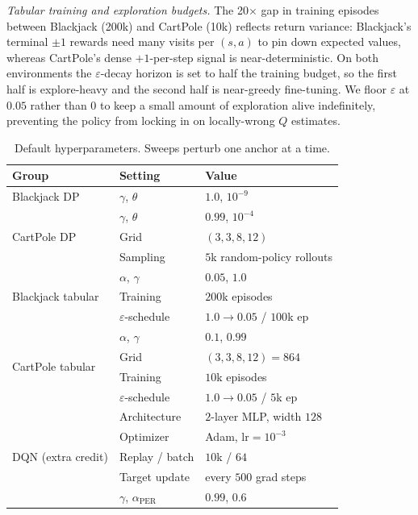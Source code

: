\documentclass[conference]{IEEEtran}
\begin{document}
\textit{Tabular training and exploration budgets.} The 20$\times$ gap
in training episodes between Blackjack (200k) and CartPole (10k)
reflects return variance: Blackjack's terminal $\pm 1$ rewards need
many visits per $(s, a)$ to pin down expected values, whereas
CartPole's dense $+1$-per-step signal is near-deterministic. On both
environments the $\varepsilon$-decay horizon is set to half the
training budget, so the first half is explore-heavy and the second
half is near-greedy fine-tuning. We floor $\varepsilon$ at $0.05$
rather than $0$ to keep a small amount of exploration alive
indefinitely, preventing the policy from locking in on
locally-wrong $Q$ estimates.

\begin{table}[t]
\centering
\small
\caption{Default hyperparameters. Sweeps perturb one anchor at a time.}
\label{tab:defaults}
\begin{tabular}{@{}lll@{}}
\toprule
\textbf{Group} & \textbf{Setting} & \textbf{Value} \\
\midrule
Blackjack DP
  & $\gamma$, $\theta$       & $1.0$, $10^{-9}$ \\
\midrule
\multirow{3}{*}{CartPole DP}
  & $\gamma$, $\theta$       & $0.99$, $10^{-4}$ \\
  & Grid                     & $(3,3,8,12)$ \\
  & Sampling                 & $5$k random-policy rollouts \\
\midrule
\multirow{3}{*}{Blackjack tabular}
  & $\alpha$, $\gamma$       & $0.05$, $1.0$ \\
  & Training                 & $200$k episodes \\
  & $\varepsilon$-schedule   & $1.0 \to 0.05$ / $100$k ep \\
\midrule
\multirow{4}{*}{CartPole tabular}
  & $\alpha$, $\gamma$       & $0.1$, $0.99$ \\
  & Grid                     & $(3,3,8,12) = 864$ \\
  & Training                 & $10$k episodes \\
  & $\varepsilon$-schedule   & $1.0 \to 0.05$ / $5$k ep \\
\midrule
\multirow{5}{*}{DQN (extra credit)}
  & Architecture             & $2$-layer MLP, width $128$ \\
  & Optimizer                & Adam, $\mathrm{lr} = 10^{-3}$ \\
  & Replay / batch           & $10$k / $64$ \\
  & Target update            & every $500$ grad steps \\
  & $\gamma$, $\alpha_\text{PER}$ & $0.99$, $0.6$ \\
\bottomrule
\end{tabular}
\end{table}
\end{document}
